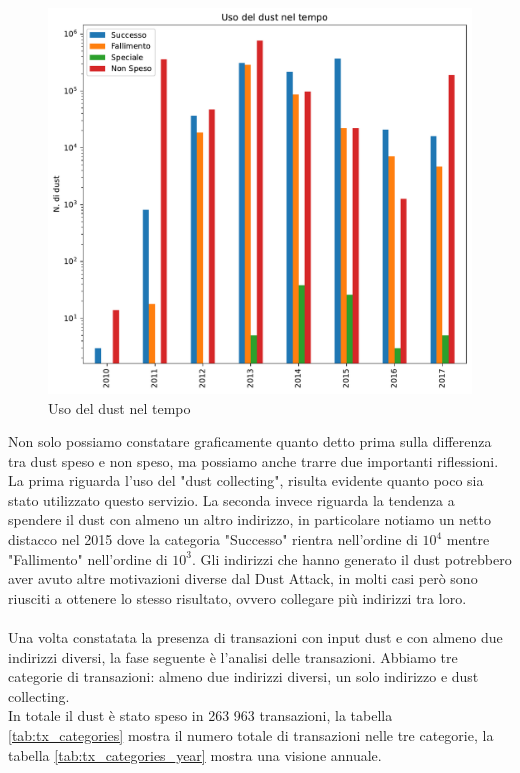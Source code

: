 \begin{figure}[h!]
    \centering
    \includegraphics[scale=0.7]{Grafici/uso_del_dust_new.pdf}
    \caption{Uso del dust nel tempo}
    \label{fig:dust_year}
\end{figure}
\FloatBarrier
Non solo possiamo constatare graficamente quanto detto prima sulla differenza tra dust speso e non speso, ma possiamo anche trarre due importanti riflessioni. La prima riguarda l'uso del "dust collecting", risulta evidente quanto poco sia stato utilizzato questo servizio. La seconda invece riguarda la tendenza a spendere il dust con almeno un altro indirizzo, in particolare notiamo un netto distacco nel 2015 dove la categoria "Successo" rientra nell'ordine di $10^4$ mentre "Fallimento" nell'ordine di $10^3$. Gli indirizzi che hanno generato il dust potrebbero aver avuto altre motivazioni diverse dal Dust Attack, in molti casi però sono riusciti a ottenere lo stesso risultato, ovvero collegare più indirizzi tra loro.\\\\
Una volta constatata la presenza di transazioni con input dust e con almeno due indirizzi diversi, la fase seguente è l'analisi delle transazioni. Abbiamo tre categorie di transazioni: almeno due indirizzi diversi, un solo indirizzo e dust collecting.\\
In totale il dust è stato speso in 263 963 transazioni, la tabella \ref{tab:tx_categories} mostra il numero totale di transazioni nelle tre categorie, la tabella \ref{tab:tx_categories_year} mostra una visione annuale.

